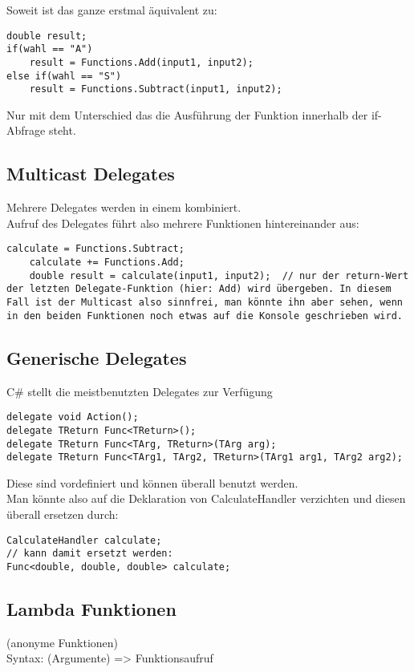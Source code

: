 Soweit ist das ganze erstmal äquivalent zu: 
\begin{lstlisting}[language={[Sharp]C}]
double result;
if(wahl == "A")	
	result = Functions.Add(input1, input2);
else if(wahl == "S")
	result = Functions.Subtract(input1, input2);
\end{lstlisting}

Nur mit dem Unterschied das die Ausführung der Funktion innerhalb der if-Abfrage steht. 

\subsection{Multicast Delegates}
Mehrere Delegates werden in einem kombiniert.\\
Aufruf des Delegates führt also mehrere Funktionen hintereinander aus:
\begin{lstlisting}[language={[Sharp]C}]
	calculate = Functions.Subtract;
	calculate += Functions.Add;
	double result = calculate(input1, input2);	// nur der return-Wert der letzten Delegate-Funktion (hier: Add) wird übergeben. In diesem Fall ist der Multicast also sinnfrei, man könnte ihn aber sehen, wenn in den beiden Funktionen noch etwas auf die Konsole geschrieben wird.
\end{lstlisting}

\subsection{Generische Delegates}
C\# stellt die meistbenutzten Delegates zur Verfügung

\begin{lstlisting}[language={[Sharp]C}]
delegate void Action();
delegate TReturn Func<TReturn>();
delegate TReturn Func<TArg, TReturn>(TArg arg);
delegate TReturn Func<TArg1, TArg2, TReturn>(TArg1 arg1, TArg2 arg2); 
\end{lstlisting}
Diese sind vordefiniert und können überall benutzt werden.\\
Man könnte also auf die Deklaration von CalculateHandler verzichten und diesen überall ersetzen durch:

\begin{lstlisting}[language={[Sharp]C}]
CalculateHandler calculate;
// kann damit ersetzt werden:
Func<double, double, double> calculate;
\end{lstlisting}
\subsection{Lambda Funktionen}
(anonyme Funktionen)\\
Syntax:  (Argumente) => Funktionsaufruf

